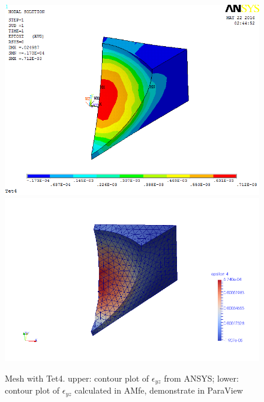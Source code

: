 \begin{figure}[htbp]
	\begin{center}
		\includegraphics[width=13cm,clip]{Tet4Eyz.png} 		
		\includegraphics[width=13cm,clip]{Tet4EyzP.png} 		
		\caption{Mesh with Tet4. upper: contour plot of $\epsilon_{yz}$ from ANSYS; lower: contour plot of $\epsilon_{yz}$ calculated in AMfe, demonstrate in ParaView} \label{fig: Tet4Eyz}
	\end{center}
\end{figure}
\clearpage 

